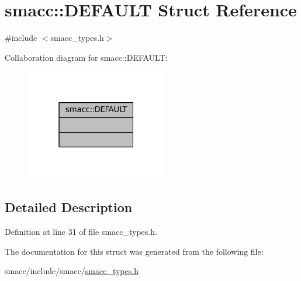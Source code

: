 \hypertarget{structsmacc_1_1DEFAULT}{}\section{smacc\+:\+:D\+E\+F\+A\+U\+LT Struct Reference}
\label{structsmacc_1_1DEFAULT}


{\ttfamily \#include $<$smacc\+\_\+types.\+h$>$}



Collaboration diagram for smacc\+:\+:D\+E\+F\+A\+U\+LT\+:
\nopagebreak
\begin{figure}[H]
\begin{center}
\leavevmode
\includegraphics[width=175pt]{structsmacc_1_1DEFAULT__coll__graph}
\end{center}
\end{figure}


\subsection{Detailed Description}


Definition at line 31 of file smacc\+\_\+types.\+h.



The documentation for this struct was generated from the following file\+:\begin{DoxyCompactItemize}
\item 
smacc/include/smacc/\hyperlink{smacc__types_8h}{smacc\+\_\+types.\+h}\end{DoxyCompactItemize}
